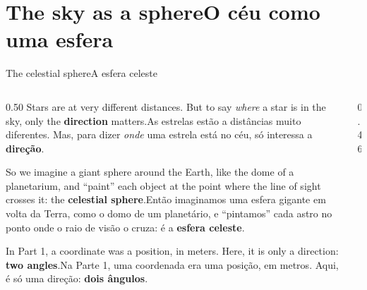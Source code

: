 \documentclass[aspectratio=169,11pt]{beamer}
\newcommand{\tr}[2]{\ifEN#2\else#1\fi}
\newcommand{\bnum}[1]{\textbf{\textcolor{mTeal}{#1}}}
\newcommand{\esferaContorno}{\draw[mStoneMid!70, thick, fill=corCeu!5] (0,0) circle (1);}
\newcommand{\esferaEquador}{%
  \draw[corCeu!70, dashed] plot[smooth] coordinates {(0.996,-0.033) (1.000,0.000) (0.996,0.033) (0.985,0.065) (0.966,0.097) (0.940,0.128) (0.906,0.158) (0.866,0.187) (0.819,0.215) (0.766,0.241) (0.707,0.265) (0.643,0.287) (0.574,0.307) (0.500,0.324) (0.423,0.340) (0.342,0.352) (0.259,0.362) (0.174,0.369) (0.087,0.373) (0.000,0.375) (-0.087,0.373) (-0.174,0.369) (-0.259,0.362) (-0.342,0.352) (-0.423,0.340) (-0.500,0.324) (-0.574,0.307) (-0.643,0.287) (-0.707,0.265) (-0.766,0.241) (-0.819,0.215) (-0.866,0.187) (-0.906,0.158) (-0.940,0.128) (-0.966,0.097) (-0.985,0.065) (-0.996,0.033) (-1.000,0.000)};
  \draw[corCeu, very thick] plot[smooth] coordinates {(-0.643,-0.287) (-0.574,-0.307) (-0.500,-0.324) (-0.423,-0.340) (-0.342,-0.352) (-0.259,-0.362) (-0.174,-0.369) (-0.087,-0.373) (0.000,-0.375) (0.087,-0.373) (0.174,-0.369) (0.259,-0.362) (0.342,-0.352) (0.423,-0.340) (0.500,-0.324) (0.574,-0.307) (0.643,-0.287) (0.707,-0.265) (0.766,-0.241) (0.819,-0.215) (0.866,-0.187) (0.906,-0.158) (0.940,-0.128) (0.966,-0.097) (0.985,-0.065) (0.996,-0.033)};
  \draw[corCeu, very thick] plot[smooth] coordinates {(-1.000,0.000) (-0.996,-0.033) (-0.985,-0.065) (-0.966,-0.097) (-0.940,-0.128) (-0.906,-0.158) (-0.866,-0.187) (-0.819,-0.215) (-0.766,-0.241) (-0.707,-0.265) (-0.643,-0.287)};
}
\begin{document}
\section{\tr{O céu como uma esfera}{The sky as a sphere}}

\begin{frame}{\tr{A esfera celeste}{The celestial sphere}}
  \begin{columns}[T]
    \begin{column}{0.50\textwidth}
      \small
      \tr{As estrelas estão a distâncias muito diferentes. Mas, para dizer \emph{onde} uma
      estrela está no céu, só interessa a \bnum{direção}.}{Stars are at very different
      distances. But to say \emph{where} a star is in the sky, only the \bnum{direction}
      matters.}
      \medskip

      \tr{Então imaginamos uma esfera gigante em volta da Terra, como o domo de um planetário,
      e ``pintamos'' cada astro no ponto onde o raio de visão o cruza: é a \bnum{esfera
      celeste}.}{So we imagine a giant sphere around the Earth, like the dome of a planetarium,
      and ``paint'' each object at the point where the line of sight crosses it: the
      \bnum{celestial sphere}.}
      \medskip

      \begin{ideia}[title={\tr{Direção, não posição}{Direction, not position}}]
        \footnotesize\tr{Na Parte 1, uma coordenada era uma posição, em metros. Aqui, é só uma
        direção: \bnum{dois ângulos}.}{In Part 1, a coordinate was a position, in meters. Here,
        it is only a direction: \bnum{two angles}.}
      \end{ideia}
    \end{column}
    \begin{column}{0.46\textwidth}
      \centering
    \end{column}
  \end{columns}
\end{frame}
\end{document}
